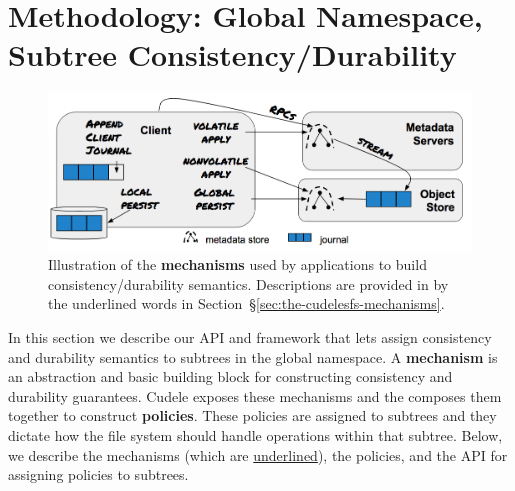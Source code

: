 \section{Methodology: Global Namespace, Subtree Consistency/Durability}
\label{sec:methodology-decoupled-namespaces}

\begin{figure}[tb]
\centering
\includegraphics[width=1.0\linewidth]{figures/fig-decouple.png}
\caption{Illustration of the \textbf{mechanisms} used by applications to build
consistency/durability semantics. Descriptions are provided in by the
underlined words in Section~\S\ref{sec:the-cudelesfs-mechanisms}.
}\label{fig:decouple}
\end{figure}


In this section we describe our API and framework that lets
 assign consistency and durability
semantics to subtrees in the global namespace. A \textbf{mechanism} is an
abstraction and basic building block for constructing consistency and
durability guarantees. Cudele exposes these mechanisms and the
 composes them together to
construct \textbf{policies}.  These policies are assigned to subtrees and they
dictate how the file system should handle operations within that subtree.
Below, we describe the mechanisms (which are \underline{underlined}), the
policies, and the API for assigning policies to subtrees.

